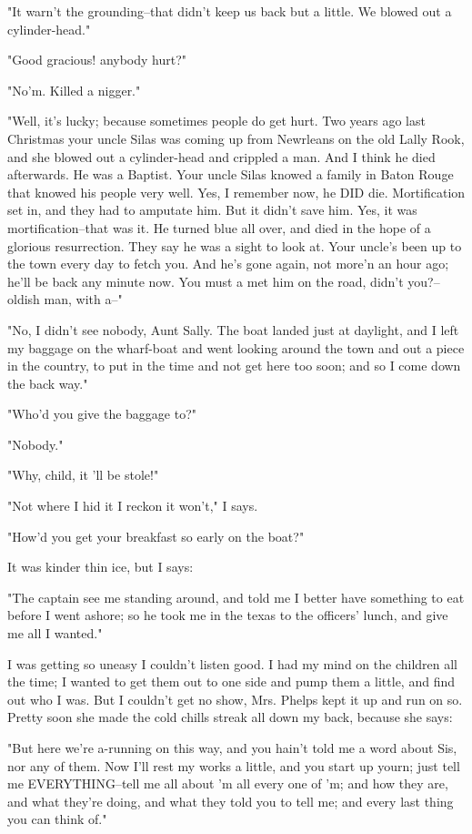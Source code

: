 "It warn't the grounding--that didn't keep us back but a little.  We
blowed out a cylinder-head."

"Good gracious! anybody hurt?"

"No'm.  Killed a nigger."

"Well, it's lucky; because sometimes people do get hurt.  Two years ago
last Christmas your uncle Silas was coming up from Newrleans on the old
Lally Rook, and she blowed out a cylinder-head and crippled a man.  And I
think he died afterwards.  He was a Baptist.  Your uncle Silas knowed a
family in Baton Rouge that knowed his people very well.  Yes, I remember
now, he DID die.  Mortification set in, and they had to amputate him.
But it didn't save him.  Yes, it was mortification--that was it.  He
turned blue all over, and died in the hope of a glorious resurrection.
They say he was a sight to look at.  Your uncle's been up to the town
every day to fetch you. And he's gone again, not more'n an hour ago;
he'll be back any minute now. You must a met him on the road, didn't
you?--oldish man, with a--"

"No, I didn't see nobody, Aunt Sally.  The boat landed just at daylight,
and I left my baggage on the wharf-boat and went looking around the town
and out a piece in the country, to put in the time and not get here too
soon; and so I come down the back way."

"Who'd you give the baggage to?"

"Nobody."

"Why, child, it 'll be stole!"

"Not where I hid it I reckon it won't," I says.

"How'd you get your breakfast so early on the boat?"

It was kinder thin ice, but I says:

"The captain see me standing around, and told me I better have something
to eat before I went ashore; so he took me in the texas to the officers'
lunch, and give me all I wanted."

I was getting so uneasy I couldn't listen good.  I had my mind on the
children all the time; I wanted to get them out to one side and pump them
a little, and find out who I was.  But I couldn't get no show, Mrs.
Phelps kept it up and run on so.  Pretty soon she made the cold chills
streak all down my back, because she says:

"But here we're a-running on this way, and you hain't told me a word
about Sis, nor any of them.  Now I'll rest my works a little, and you
start up yourn; just tell me EVERYTHING--tell me all about 'm all every
one of 'm; and how they are, and what they're doing, and what they told
you to tell me; and every last thing you can think of."


